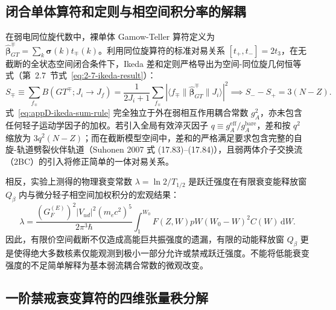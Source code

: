 \subsection{闭合单体算符和定则与相空间积分率的解耦}

在弱电同位旋代数中，裸单体 Gamow-Teller 算符定义为 $\hat{\boldsymbol{\beta}}^\mp_{GT} = \sum_k \boldsymbol{\sigma}(k) t_\mp(k)$。利用同位旋算符的标准对易关系 $[t_+, t_-] = 2 t_3$，在无截断的全状态空间闭合条件下，Ikeda 差和定则严格导出为空间-同位旋几何恒等式（第~2.7~节式~\eqref{eq:2-7-ikeda-result}）：
\begin{equation}\label{eq:appD-ikeda-sum-rule}
S_\mp \equiv \sum_{f_\mp} B(GT^\mp; J_i \to J_f) = \frac{1}{2J_i + 1} \sum_{f_\mp} |\langle f_\mp \| \hat{\boldsymbol{\beta}}^\mp_{GT} \| J_i \rangle|^2 \implies S_- - S_+ = 3(N - Z).
\end{equation}
式~\eqref{eq:appD-ikeda-sum-rule} 完全独立于外在弱相互作用耦合常数 $g_A^2$，亦未包含任何轻子运动学因子的加权。若引入全局有效淬灭因子 $q \equiv g_A^{\mathrm{eff}} / g_A^{\mathrm{bare}}$，差和按 $q^2$ 缩放为 $3 q^2 (N - Z)$；而在截断模型空间中，差和的严格满足要求包含完整的自旋-轨道劈裂伙伴轨道（Suhonen 2007 式 (17.83)–(17.84)），且弱两体介子交换流（2BC）的引入将修正简单的一体对易关系。

相反，实验上测得的物理衰变常数 $\lambda = \ln 2 / T_{1/2}$ 是跃迁强度在有限衰变能释放窗 $Q_\beta$ 内与微分轻子相空间加权积分的宏观结果：
\begin{equation}\label{eq:appD-lambda-phase-space}
\lambda = \frac{(G_F^{(E)})^2 |V_{ud}|^2 (m_e c^2)^5}{2\pi^3 \hbar} \int_1^{W_0} F(Z, W) p W (W_0 - W)^2 C(W) \, \mathrm{d}W.
\end{equation}
因此，有限价空间截断不仅造成高能巨共振强度的遗漏，有限的动能释放窗 $Q_\beta$ 更是使得绝大多数核素仅能观测到极小一部分允许或禁戒跃迁强度。不能将低能衰变强度的不足简单解释为基本弱流耦合常数的微观改变。

\subsection{一阶禁戒衰变算符的四维张量秩分解}

